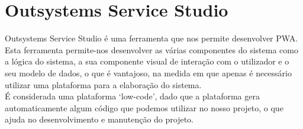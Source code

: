 \section{Outsystems Service Studio} \label{sec:outsystems}
Outsystems Service Studio é uma ferramenta que nos permite desenvolver PWA. Esta ferramenta permite-nos desenvolver as várias componentes do sistema como a lógica do sistema, a sua componente visual de interação com o utilizador e o seu modelo de dados, o que é vantajoso, na medida em que apenas é necessário utilizar uma plataforma para a elaboração do sistema. \\
É considerada uma plataforma ‘low-code’, dado que a plataforma gera automaticamente algum código que podemos utilizar no nosso projeto, o que ajuda no desenvolvimento e manutenção do projeto.

